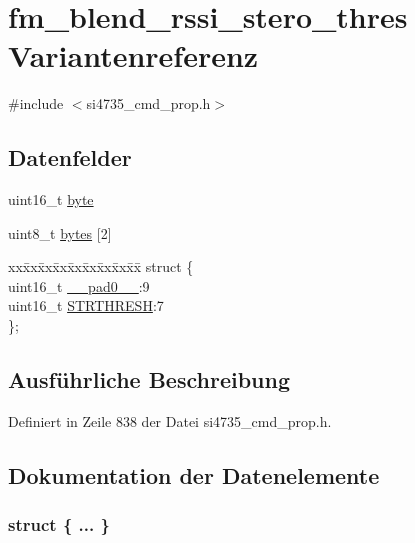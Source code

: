 \hypertarget{unionfm__blend__rssi__stero__thres}{}\section{fm\+\_\+blend\+\_\+rssi\+\_\+stero\+\_\+thres Variantenreferenz}
\label{unionfm__blend__rssi__stero__thres}


{\ttfamily \#include $<$si4735\+\_\+cmd\+\_\+prop.\+h$>$}

\subsection*{Datenfelder}
\begin{DoxyCompactItemize}
\item 
uint16\+\_\+t \hyperlink{unionfm__blend__rssi__stero__thres_ab0549c1b5ea980a02e7eab77e21fea49}{byte}
\item 
uint8\+\_\+t \hyperlink{unionfm__blend__rssi__stero__thres_a46e4c05d20a047ec169f60d3167e912e}{bytes} \mbox{[}2\mbox{]}
\item 
\begin{tabbing}
xx\=xx\=xx\=xx\=xx\=xx\=xx\=xx\=xx\=\kill
struct \{\\
\>uint16\_t \hyperlink{unionfm__blend__rssi__stero__thres_a77132c2c26a75f5b8751b235cda23828}{\_\_pad0\_\_}:9\\
\>uint16\_t \hyperlink{unionfm__blend__rssi__stero__thres_ae59cc6ed2c20ceb75c5065984e1751d1}{STRTHRESH}:7\\
\}; \\

\end{tabbing}\end{DoxyCompactItemize}


\subsection{Ausführliche Beschreibung}


Definiert in Zeile 838 der Datei si4735\+\_\+cmd\+\_\+prop.\+h.



\subsection{Dokumentation der Datenelemente}
\hypertarget{unionfm__blend__rssi__stero__thres_a36b52177ebd61173eac0353dddd8507d}{}\subsubsection[{"@103}]{\setlength{\rightskip}{0pt plus 5cm}struct \{ ... \} }\label{unionfm__blend__rssi__stero__thres_a36b52177ebd61173eac0353dddd8507d}
\hypertarget{unionfm__blend__rssi__stero__thres_a77132c2c26a75f5b8751b235cda23828}{}
